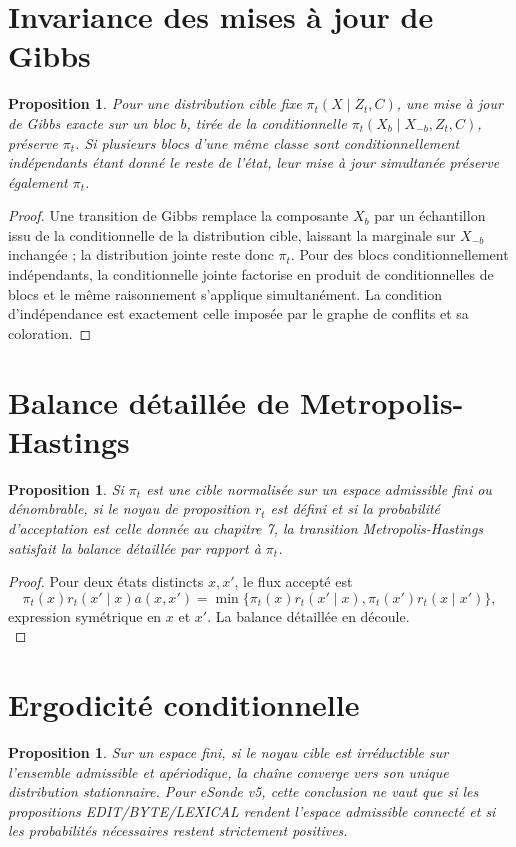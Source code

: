 \documentclass[11pt,a4paper,oneside]{report}
\newtheorem{proposition}[definition]{Proposition}
\begin{document}
\section{Invariance des mises à jour de Gibbs}
\begin{proposition}
Pour une distribution cible fixe $\pi_t(X\mid Z_t,C)$, une mise à jour de Gibbs exacte sur un bloc $b$, tirée de la conditionnelle $\pi_t(X_b\mid X_{-b},Z_t,C)$, préserve $\pi_t$. Si plusieurs blocs d'une même classe sont conditionnellement indépendants étant donné le reste de l'état, leur mise à jour simultanée préserve également $\pi_t$.
\end{proposition}
\begin{proof}
Une transition de Gibbs remplace la composante $X_b$ par un échantillon issu de la conditionnelle de la distribution cible, laissant la marginale sur $X_{-b}$ inchangée ; la distribution jointe reste donc $\pi_t$. Pour des blocs conditionnellement indépendants, la conditionnelle jointe factorise en produit de conditionnelles de blocs et le même raisonnement s'applique simultanément. La condition d'indépendance est exactement celle imposée par le graphe de conflits et sa coloration.
\end{proof}

\section{Balance détaillée de Metropolis-Hastings}
\begin{proposition}
Si $\pi_t$ est une cible normalisée sur un espace admissible fini ou dénombrable, si le noyau de proposition $r_t$ est défini et si la probabilité d'acceptation est celle donnée au chapitre 7, la transition Metropolis-Hastings satisfait la balance détaillée par rapport à $\pi_t$.
\end{proposition}
\begin{proof}
Pour deux états distincts $x,x'$, le flux accepté est
\[
\pi_t(x)r_t(x'\mid x)a(x,x')=\min\{\pi_t(x)r_t(x'\mid x),\pi_t(x')r_t(x\mid x')\},
\]
expression symétrique en $x$ et $x'$. La balance détaillée en découle.\\
\end{proof}

\section{Ergodicité conditionnelle}
\begin{proposition}
Sur un espace fini, si le noyau cible est irréductible sur l'ensemble admissible et apériodique, la chaîne converge vers son unique distribution stationnaire. Pour eSonde v5, cette conclusion ne vaut que si les propositions EDIT/BYTE/LEXICAL rendent l'espace admissible connecté et si les probabilités nécessaires restent strictement positives.
\end{proposition}
\end{document}

